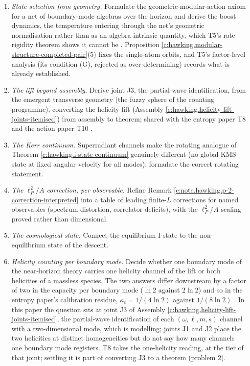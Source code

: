 \documentclass[11pt]{article}
\theoremstyle{definition}
\theoremstyle{plain}
\begin{document}
\begin{enumerate}
\item \emph{State selection from geometry.} Formulate the geometric-modular-action axiom for a net of boundary-mode algebras over the horizon and derive the boost dynamics, the temperature entering through the net's geometric normalisation rather than as an algebra-intrinsic quantity, which T5's rate-rigidity theorem shows it cannot be \cite[Thm.~7.16]{ButlerT5}. Proposition \ref{c:hawking.modular-structure-completed-pair}(5) fixes the single-atom orbits, and T5's factor-level analysis (its condition (G), rejected as over-determining) records what is already established.
\item \emph{The lift beyond assembly.} Derive joint J3, the partial-wave identification, from the emergent transverse geometry (the fuzzy sphere of the counting programme), converting the helicity lift (Assembly \ref{c:hawking.helicity-lift-joints-itemised}) from assembly to theorem; shared with the entropy paper T8 \cite{ButlerT8} and the action paper T10 \cite{ButlerT10}.
\item \emph{The Kerr continuum.} Superradiant channels make the rotating analogue of Theorem \ref{c:hawking.i-state-continuum} genuinely different (no global KMS state at fixed angular velocity for all modes); formulate the correct rotating statement.
\item \emph{The $\ell_P^2/A$ correction, per observable.} Refine Remark \ref{c:note.hawking.p-2-correction-interpreted} into a table of leading finite-$L$ corrections for named observables (spectrum distortion, correlator deficits), with the $\ell_P^2/A$ scaling proved rather than dimensional.
\item \emph{The cosmological state.} Connect the equilibrium I-state to the non-equilibrium state of the descent.
\item \emph{Helicity counting per boundary mode.} Decide whether one boundary mode of the near-horizon theory carries one helicity channel of the lift or both helicities of a massless species. The two answers differ downstream by a factor of two in the capacity per boundary mode ($\ln 2$ against $2\ln 2$) and so in the entropy paper's calibration residue, $\kappa_c = 1/(4\ln 2)$ against $1/(8\ln 2)$ \cite[Prop.~4.12]{ButlerT8}. In this paper the question sits at joint J3 of Assembly \ref{c:hawking.helicity-lift-joints-itemised}, the partial-wave identification of each $(\omega, \ell, m, s)$ channel with a two-dimensional mode, which is modelling; joints J1 and J2 place the two helicities at distinct homogeneities but do not say how many channels one boundary mode registers. T8 takes the one-helicity reading, at the tier of that joint; settling it is part of converting J3 to a theorem (problem 2).
\end{enumerate}
\end{document}

